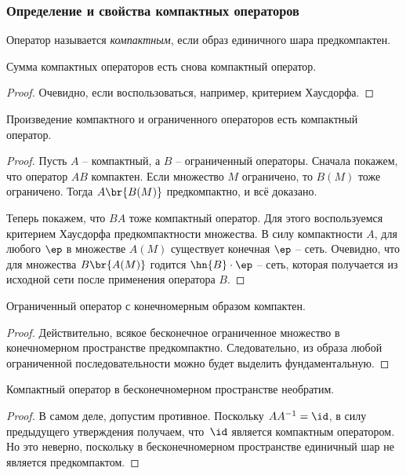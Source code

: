 \documentclass[a4paper]{article}
\begin{document}
\subsubsection{Определение и свойства компактных операторов}

\begin{df}
Оператор называется \emph{компактным}, если образ единичного шара предкомпактен.
\end{df}

\begin{stm}
Сумма компактных операторов есть снова компактный оператор.
\end{stm}
\begin{proof}
Очевидно, если воспользоваться, например, критерием Хаусдорфа.
\end{proof}

\begin{stm}
Произведение компактного и ограниченного операторов есть компактный оператор.
\end{stm}
\begin{proof}
Пусть $A$ -- компактный, а $B$ -- ограниченный операторы. Сначала покажем,
что оператор $AB$ компактен. Если множество $M$ ограничено, то $B(M)$ тоже ограничено.
Тогда $A\br{B(M)}$ предкомпактно, и всё доказано.

Теперь покажем, что $BA$ тоже компактный оператор. Для этого воспользуемся критерием Хаусдорфа
предкомпактности множества. В силу компактности $A$, для любого $\ep$ в множестве
$A(M)$ существует конечная $\ep$ -- сеть. Очевидно, что для множества $B\br{A(M)}$ годится
$\hn{B}\cdot \ep$ -- сеть, которая получается из исходной сети после применения оператора $B$.
\end{proof}

\begin{stm}
Ограниченный оператор с конечномерным образом компактен.
\end{stm}
\begin{proof}
Действительно, всякое бесконечное ограниченное множество в конечномерном пространстве
предкомпактно. Следовательно, из образа любой ограниченной последовательности
можно будет выделить фундаментальную.
\end{proof}

\begin{imp}
Компактный оператор в бесконечномерном пространстве необратим.
\end{imp}
\begin{proof}
В самом деле, допустим противное. Поскольку $AA^{-1} = \id$, в силу предыдущего
утверждения получаем, что~$\id$ является компактным оператором. Но это неверно,
поскольку в бесконечномерном пространстве единичный шар не является предкомпактом.
\end{proof}
\end{document}
